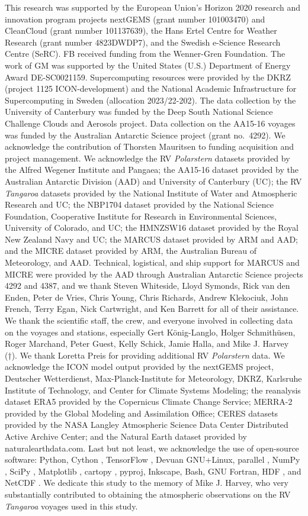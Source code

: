 \documentclass[draft]{agujournal2019}
\begin{document}
This research was supported by the European Union’s Horizon 2020 research and innovation program projects nextGEMS (grant number 101003470) and CleanCloud (grant number 101137639), the Hans Ertel Centre for Weather Research (grant number 4823DWDP7), and the Swedish e-Science Research Centre (SeRC). FB received funding from the Wenner-Gren Foundation. The work of GM was supported by the United States (U.S.) Department of Energy Award DE-SC0021159. Supercomputing resources were provided by the DKRZ (project 1125 ICON-development) and the National Academic Infrastructure for Supercomputing in Sweden (allocation 2023/22-202). The data collection by the University of Canterbury was funded by the Deep South National Science Challenge Clouds and Aerosols project. Data collection on the AA15-16 voyages was funded by the Australian Antarctic Science project (grant no.~4292). We acknowledge the contribution of Thorsten Mauritsen to funding acquisition and project management. We acknowledge the RV \emph{Polarstern} datasets provided by the Alfred Wegener Institute and Pangaea; the AA15-16 dataset provided by the Australian Antarctic Division (AAD) and University of Canterbury (UC); the RV \emph{Tangaroa} datasets provided by the National Institute of Water and Atmospheric Research and UC; the NBP1704 dataset provided by the National Science Foundation, Cooperative Institute for Research in Environmental Sciences, University of Colorado, and UC; the HMNZSW16 dataset provided by the Royal New Zealand Navy and UC; the MARCUS dataset provided by ARM and AAD; and the MICRE dataset provided by ARM, the Australian Bureau of Meteorology, and AAD. Technical, logistical, and ship support for MARCUS and MICRE were provided by the AAD through Australian Antarctic Science projects 4292 and 4387, and we thank Steven Whiteside, Lloyd Symonds, Rick van den Enden, Peter de Vries, Chris Young, Chris Richards, Andrew Klekociuk, John French, Terry Egan, Nick Cartwright, and Ken Barrett for all of their assistance. We thank the scientific staff, the crew, and everyone involved in collecting data on the voyages and stations, especially Gert König-Langlo, Holger Schmithüsen, Roger Marchand, Peter Guest, Kelly Schick, Jamie Halla, and Mike J. Harvey (†). We thank Loretta Preis for providing additional RV \emph{Polarstern} data. We acknowledge the ICON model output provided by the nextGEMS project, Deutscher Wetterdienst, Max-Planck-Institute for Meteorology, DKRZ, Karlsruhe Institute of Technology, and Center for Climate Systems Modeling; the reanalysis dataset ERA5 provided by the Copernicus Climate Change Service; MERRA-2 provided by the Global Modeling and Assimilation Office; CERES datasets provided by the NASA Langley Atmospheric Science Data Center Distributed Active Archive Center; and the Natural Earth dataset provided by naturalearthdata.com. Last but not least, we acknowledge the use of open-source software: Python, Cython \cite{behnel2011}, TensorFlow \cite{abadi2016}, Devuan GNU+Linux, parallel \cite{tange2011}, NumPy \cite{harris2020}, SciPy \cite{virtanen2020}, Matplotlib \cite{hunter2007}, cartopy \cite{cartopy}, pyproj, Inkscape, Bash, GNU Fortran, HDF \cite{folk1999}, and NetCDF \cite{rew1990}. We dedicate this study to the memory of Mike J. Harvey, who very substantially contributed to obtaining the atmospheric observations on the RV \emph{Tangaroa} voyages used in this study.


\end{document}
